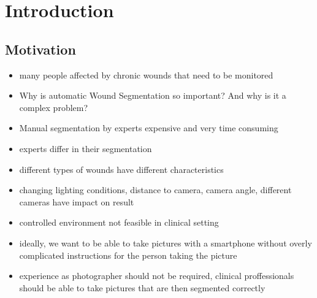 \section{Introduction}

\subsection{Motivation}

\begin{itemize}
	\item many people affected by chronic wounds that need to be monitored
	\item Why is automatic Wound Segmentation so important? And why is it a complex problem?
	\item Manual segmentation by experts expensive and very time consuming
	\item experts differ in their segmentation
	\item different types of wounds have different characteristics
	\item changing lighting conditions, distance to camera, camera angle, different cameras have impact on result
	\item controlled environment not feasible in clinical setting
	\item ideally, we want to be able to take pictures with a smartphone without overly complicated instructions for the person taking the picture
	\item experience as photographer should not be required, clinical proffessionals should be able to take pictures that are then segmented correctly
\end{itemize}

%



